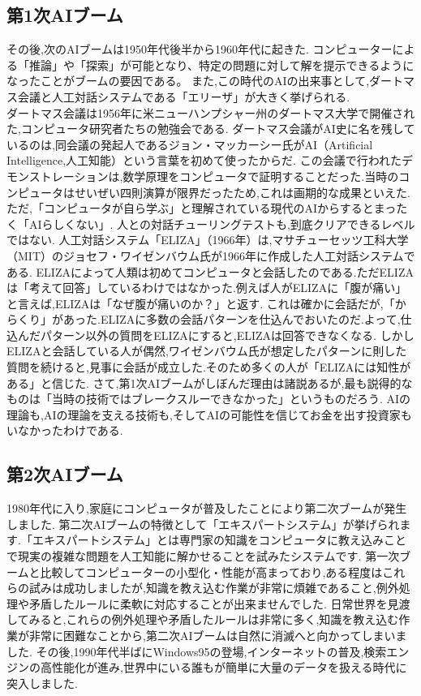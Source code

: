 \subsection{第1次AIブーム}
その後,次のAIブームは1950年代後半から1960年代に起きた.
コンピューターによる「推論」や「探索」が可能となり、特定の問題に対して解を提示できるようになったことがブームの要因である。
また,この時代のAIの出来事として,ダートマス会議と人工対話システムである「エリーザ」が大きく挙げられる.\\
ダートマス会議は1956年に米ニューハンプシャー州のダートマス大学で開催された,コンピュータ研究者たちの勉強会である.
ダートマス会議がAI史に名を残しているのは,同会議の発起人であるジョン・マッカーシー氏がAI（Artificial Intelligence,人工知能）という言葉を初めて使ったからだ.
この会議で行われたデモンストレーションは,数学原理をコンピュータで証明することだった.当時のコンピュータはせいぜい四則演算が限界だったため,これは画期的な成果といえた.
ただ,「コンピュータが自ら学ぶ」と理解されている現代のAIからするとまったく「AIらしくない」.
人との対話チューリングテストも,到底クリアできるレベルではない. 
人工対話システム「ELIZA」（1966年）は,マサチューセッツ工科大学（MIT）のジョセフ・ワイゼンバウム氏が1966年に作成した人工対話システムである.
ELIZAによって人類は初めてコンピュータと会話したのである.ただELIZAは「考えて回答」しているわけではなかった.例えば人がELIZAに「腹が痛い」と言えば,ELIZAは「なぜ腹が痛いのか？」と返す.
これは確かに会話だが,「からくり」があった.ELIZAに多数の会話パターンを仕込んでおいたのだ.よって,仕込んだパターン以外の質問をELIZAにすると,ELIZAは回答できなくなる.
しかしELIZAと会話している人が偶然,ワイゼンバウム氏が想定したパターンに則した質問を続けると,見事に会話が成立した.そのため多くの人が「ELIZAには知性がある」と信じた. 
さて,第1次AIブームがしぼんだ理由は諸説あるが,最も説得的なものは「当時の技術ではブレークスルーできなかった」というものだろう.
AIの理論も,AIの理論を支える技術も,そしてAIの可能性を信じてお金を出す投資家もいなかったわけである.
\subsection{第2次AIブーム}
1980年代に入り,家庭にコンピュータが普及したことにより第二次ブームが発生しました.
第二次AIブームの特徴として「エキスパートシステム」が挙げられます.「エキスパートシステム」とは専門家の知識をコンピュータに教え込みことで現実の複雑な問題を人工知能に解かせることを試みたシステムです.
第一次ブームと比較してコンピューターの小型化・性能が高まっており,ある程度はこれらの試みは成功しましたが,知識を教え込む作業が非常に煩雑であること,例外処理や矛盾したルールに柔軟に対応することが出来ませんでした.
日常世界を見渡してみると,これらの例外処理や矛盾したルールは非常に多く,知識を教え込む作業が非常に困難なことから,第二次AIブームは自然に消滅へと向かってしまいました.
その後,1990年代半ばにWindows95の登場,インターネットの普及,検索エンジンの高性能化が進み,世界中にいる誰もが簡単に大量のデータを扱える時代に突入しました.\\
